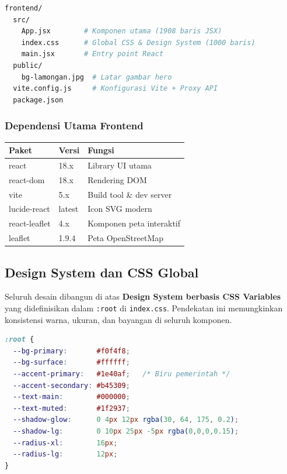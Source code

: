 \documentclass[12pt,a4paper]{article}
\begin{document}
\begin{lstlisting}[language=bash, caption=Struktur direktori frontend]
frontend/
  src/
    App.jsx        # Komponen utama (1908 baris JSX)
    index.css      # Global CSS & Design System (1000 baris)
    main.jsx       # Entry point React
  public/
    bg-lamongan.jpg  # Latar gambar hero
  vite.config.js     # Konfigurasi Vite + Proxy API
  package.json
\end{lstlisting}

\subsubsection{Dependensi Utama Frontend}

\begin{center}
\begin{tabular}{llp{6.5cm}}
  \toprule
  \textbf{Paket} & \textbf{Versi} & \textbf{Fungsi} \\
  \midrule
  react & 18.x & Library UI utama \\
  react-dom & 18.x & Rendering DOM \\
  vite & 5.x & Build tool \& dev server \\
  lucide-react & latest & Icon SVG modern \\
  react-leaflet & 4.x & Komponen peta interaktif \\
  leaflet & 1.9.4 & Peta OpenStreetMap \\
  \bottomrule
\end{tabular}
\end{center}

\subsection{Design System dan CSS Global}

Seluruh desain dibangun di atas \textbf{Design System berbasis CSS Variables} yang
didefinisikan dalam \texttt{:root} di \texttt{index.css}. Pendekatan ini memungkinkan
konsistensi warna, ukuran, dan bayangan di seluruh komponen.

\begin{lstlisting}[language=CSS, caption=CSS Variables (Design Tokens) pada index.css]
:root {
  --bg-primary:       #f0f4f8;
  --bg-surface:       #ffffff;
  --accent-primary:   #1e40af;   /* Biru pemerintah */
  --accent-secondary: #b45309;
  --text-main:        #000000;
  --text-muted:       #1f2937;
  --shadow-glow:      0 4px 12px rgba(30, 64, 175, 0.2);
  --shadow-lg:        0 10px 25px -5px rgba(0,0,0,0.15);
  --radius-xl:        16px;
  --radius-lg:        12px;
}
\end{lstlisting}
\end{document}
